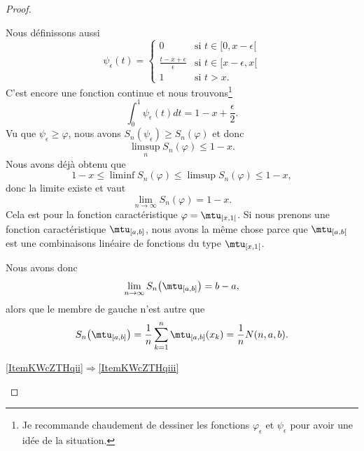\begin{proof}
\begin{subproof}
    Nous définissons aussi
    \begin{equation}
        \psi_{\epsilon}(t)=\begin{cases}
            0    &   \text{si } t\in \mathopen[ 0 , x-\epsilon [\\
            \frac{ t-x+\epsilon }{ \epsilon }    &   \text{si } t\in\mathopen[ x-\epsilon , x [\\
            1    &    \text{si } t>x.
        \end{cases}
    \end{equation}
    C'est encore une fonction continue et nous trouvons\footnote{Je recommande chaudement de dessiner les fonctions \( \varphi_{\epsilon}\) et \( \psi_{\epsilon}\) pour avoir une idée de la situation.}
    \begin{equation}
        \int_0^1\psi_{\epsilon}(t)dt=1-x+\frac{ \epsilon }{2}.
    \end{equation}
    Vu que \( \psi_{\epsilon}\geq\varphi\), nous avons \( S_n(\psi_{\epsilon})\geq S_n(\varphi)\) et donc
    \begin{equation}
        \limsup_{n}S_n(\varphi)\leq 1-x.
    \end{equation}
    Nous avons déjà obtenu que
    \begin{equation}
        1-x\leq\liminf S_n(\varphi)\leq \limsup S_n(\varphi)\leq 1-x,
    \end{equation}
    donc la limite existe et vaut
    \begin{equation}
        \lim_{n\to \infty} S_n(\varphi)=1-x.
    \end{equation}
    Cela est pour la fonction caractéristique \( \varphi=\mtu_{\mathopen[ x , 1 [}\). Si nous prenons une fonction caractéristique \( \mtu_{\mathopen[ a , b \mathclose]}\), nous avons la même chose parce que \( \mtu_{\mathopen[ a , b [}\) est une combinaisons linéaire de fonctions du type \( \mtu_{\mathopen[ x , 1 [}\).

    Nous avons donc
    \begin{equation}
        \lim_{n\to \infty} S_n\big( \mtu_{\mathopen[ a , b \mathclose]} \big)=b-a,
    \end{equation}
    alors que le membre de gauche n'est autre que
    \begin{equation}
        S_n\big( \mtu_{\mathopen[ a , b \mathclose]} \big)=\frac{1}{ n }\sum_{k=1}^n\mtu_{\mathopen[ a , b \mathclose]}(x_k)=\frac{1}{ n }N(n,a,b).
    \end{equation}

    \item[\ref{ItemKWcZTHqii}\( \Rightarrow\)\ref{ItemKWcZTHqiii}]


\end{subproof}
\end{proof}
